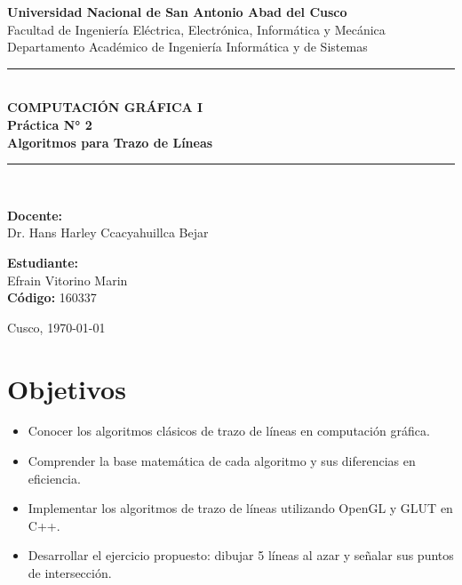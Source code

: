 \documentclass[12pt,a4paper]{article}
\begin{document}
\begin{titlepage}
  \centering
  \vspace*{0.5cm}

  {\large \textbf{Universidad Nacional de San Antonio Abad del Cusco}}\\[0.3cm]
  {\normalsize Facultad de Ingeniería Eléctrica, Electrónica, Informática y Mecánica}\\[0.1cm]
  {\normalsize Departamento Académico de Ingeniería Informática y de Sistemas}\\[1.5cm]

  \rule{\linewidth}{0.5mm}\\[0.4cm]
  {\LARGE \textbf{COMPUTACIÓN GRÁFICA I}}\\[0.3cm]
  {\Large \textbf{Práctica N° 2}}\\[0.2cm]
  {\large \textbf{Algoritmos para Trazo de Líneas}}\\[0.2cm]
  \rule{\linewidth}{0.5mm}\\[1.8cm]

  \begin{minipage}{0.48\textwidth}
    \begin{flushleft}
      \textbf{Docente:}\\
      Dr. Hans Harley Ccacyahuillca Bejar
    \end{flushleft}
  \end{minipage}
  \hfill
  \begin{minipage}{0.48\textwidth}
    \begin{flushright}
      \textbf{Estudiante:}\\
      Efrain Vitorino Marin\\
      \textbf{Código:} 160337
    \end{flushright}
  \end{minipage}

  \vfill
  {\normalsize Cusco, \today}
\end{titlepage}

\tableofcontents
\newpage

\section{Objetivos}

\begin{itemize}
  \item Conocer los algoritmos clásicos de trazo de líneas en computación gráfica.
  \item Comprender la base matemática de cada algoritmo y sus diferencias en eficiencia.
  \item Implementar los algoritmos de trazo de líneas utilizando OpenGL y GLUT en C++.
  \item Desarrollar el ejercicio propuesto: dibujar 5 líneas al azar y señalar sus puntos de intersección.
\end{itemize}
\end{document}
